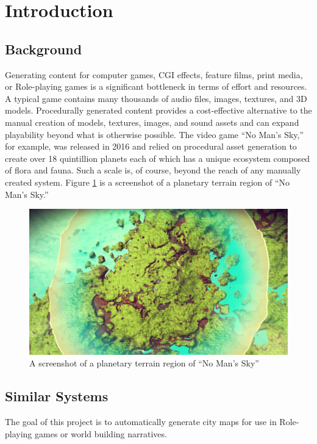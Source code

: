 \section{Introduction}
\label{sec:Introduction}

\subsection{Background}
Generating content for computer games, CGI effects, feature films, print media, or Role-playing games is a significant bottleneck in terms of effort and resources. A typical game contains many thousands of audio files, images, textures, and 3D models. Procedurally generated content provides a cost-effective alternative to the manual creation of models, textures, images, and sound assets and can expand playability beyond what is otherwise possible. The video game ``No Man's Sky,'' for example, was released in 2016 and relied on procedural asset generation to create over 18 quintillion planets each of which has a unique ecosystem composed of flora and fauna. Such a scale is, of course, beyond the reach of any manually created system. Figure \ref{Screenshot NoManSky} is a screenshot of a planetary terrain region of ``No Man's Sky.''

\begin{figure}[htb]
\centering
\includegraphics[width=\textwidth]{section01/assets/screenshot_NoManSky.jpg}
\caption[A screenshot of a planetary terrain region of ``No Man's Sky'']{\label{Screenshot NoManSky}A screenshot of a planetary terrain region of ``No Man's Sky''}
\end{figure}

\subsection{Similar Systems}
The goal of this project is to automatically generate city maps for use in Role-playing games or world building narratives.

